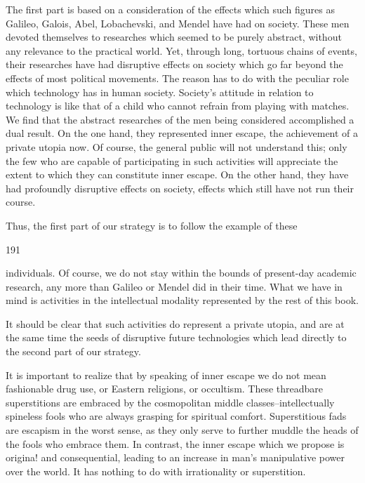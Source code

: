 \documentclass[10pt,twoside]{memoir}
\begin{document}
\begin{enumerate}
{\begin{enumerate}
\begin{sysrules}
\begin{sysrules}
\begin{sysrules}
\begin{sysrules}
{\begin{enumerate}
{{{{{{{{{The first part is based on a consideration of the effects which such 
figures as Galileo, Galois, Abel, Lobachevski, and Mendel have had on 
society. These men devoted themselves to researches which seemed to be 
purely abstract, without any relevance to the practical world. Yet, through 
long, tortuous chains of events, their researches have had disruptive effects 
on society which go far beyond the effects of most political movements. The 
reason has to do with the peculiar role which technology has in human 
society. Society's attitude in relation to technology is like that of a child 
who cannot refrain from playing with matches. We find that 
the abstract researches of the men being considered accomplished a dual 
result. On the one hand, they represented inner escape, the achievement of a 
private utopia now. Of course, the general public will not understand this; 
only the few who are capable of participating in such activities will 
appreciate the extent to which they can constitute inner escape. On the 
other hand, they have had profoundly disruptive effects on society, effects 
which still have not run their course. 

Thus, the first part of our strategy is to follow the example of these 


191 


individuals. Of course, we do not stay within the bounds of present-day 
academic research, any more than Galileo or Mendel did in their time. What 
we have in mind is activities in the intellectual modality represented by the 
rest of this book. 

It should be clear that such activities do represent a private utopia, and are at 
the same time the seeds of disruptive future technologies which lead directly 
to the second part of our strategy. 


It is important to realize that by speaking of inner escape we do not 
mean fashionable drug use, or Eastern religions, or occultism. These 
threadbare superstitions are embraced by the cosmopolitan middle 
classes--intellectually spineless fools who are always grasping for spiritual 
comfort. Superstitious fads are escapism in the worst sense, as they only 
serve to further muddle the heads of the fools who embrace them. In 
contrast, the inner escape which we propose is origina! and consequential, 
leading to an increase in man's manipulative power over the world. It has 
nothing to do with irrationality or superstition. 

}}}}}}}}}
\end{enumerate}}
\end{sysrules}
\end{sysrules}
\end{sysrules}
\end{sysrules}
\end{enumerate}}
\end{enumerate}
\end{document}
